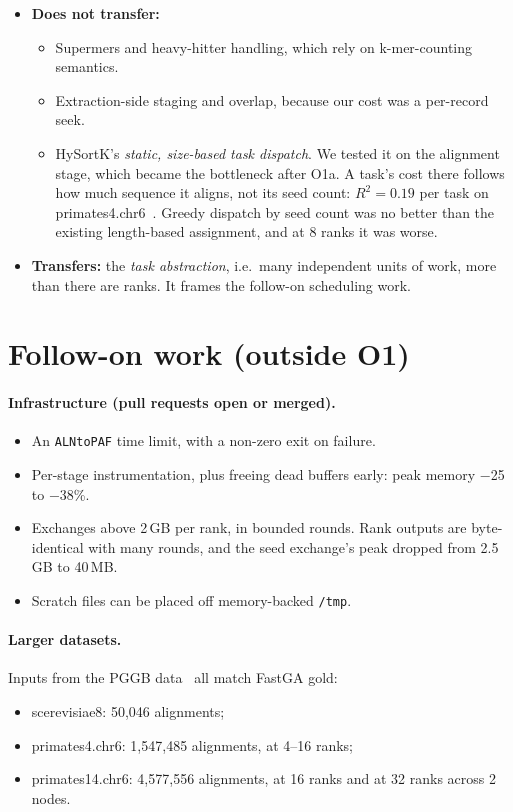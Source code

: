 \documentclass[sigconf,nonacm]{acmart}
\begin{document}
\begin{itemize}
\item \textbf{Does not transfer:}
  \begin{itemize}
  \item Supermers and heavy-hitter handling, which rely on k-mer-counting
  semantics.
  \item Extraction-side staging and overlap, because our cost was a per-record
  seek.
  \item HySortK's \emph{static, size-based task dispatch}. We tested it on the
  alignment stage, which became the bottleneck after O1a. A task's cost there
  follows how much sequence it aligns, not its seed count: $R^2 = 0.19$ per
  task on primates4.chr6~\cite{pggbdata}. Greedy dispatch by seed count was
  no better than the existing length-based assignment, and at 8 ranks it was
  worse.
  \end{itemize}
\item \textbf{Transfers:} the \emph{task abstraction}, i.e.\ many independent
units of work, more than there are ranks. It frames the follow-on scheduling
work.
\end{itemize}

\section{Follow-on work (outside O1)}

\paragraph{Infrastructure (pull requests open or merged).}
\begin{itemize}
\item An \texttt{ALNtoPAF} time limit, with a non-zero exit on failure.
\item Per-stage instrumentation, plus freeing dead buffers early: peak memory
$-$25 to $-$38\%.
\item Exchanges above 2\,GB per rank, in bounded rounds. Rank outputs are
byte-identical with many rounds, and the seed exchange's peak dropped from
2.5\,GB to 40\,MB.
\item Scratch files can be placed off memory-backed \texttt{/tmp}.
\end{itemize}

\paragraph{Larger datasets.} Inputs from the PGGB data~\cite{pggb,pggbdata}
all match FastGA gold:
\begin{itemize}
\item scerevisiae8: 50,046 alignments;
\item primates4.chr6: 1,547,485 alignments, at 4--16 ranks;
\item primates14.chr6: 4,577,556 alignments, at 16 ranks and at 32 ranks
across 2 nodes.
\end{itemize}
\end{document}
